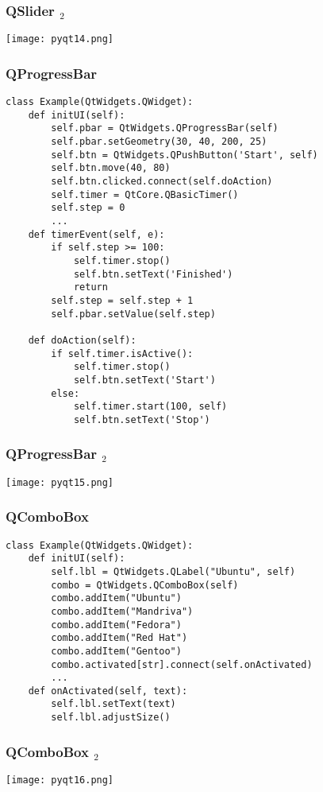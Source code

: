\documentclass[utf8,compress,aspectratio=169]{beamer}
\begin{document}
\begin{frame}[fragile]
  \frametitle{QSlider $_2$}
\begin{center}
\texttt{[image: pyqt14.png]}
\end{center}
\end{frame}

\begin{frame}
  \frametitle{QProgressBar}
\begin{verbatim}
class Example(QtWidgets.QWidget):
    def initUI(self):
        self.pbar = QtWidgets.QProgressBar(self)
        self.pbar.setGeometry(30, 40, 200, 25)
        self.btn = QtWidgets.QPushButton('Start', self)
        self.btn.move(40, 80)
        self.btn.clicked.connect(self.doAction)
        self.timer = QtCore.QBasicTimer()
        self.step = 0
        ...
    def timerEvent(self, e):
        if self.step >= 100:
            self.timer.stop()
            self.btn.setText('Finished')
            return
        self.step = self.step + 1
        self.pbar.setValue(self.step)

    def doAction(self):
        if self.timer.isActive():
            self.timer.stop()
            self.btn.setText('Start')
        else:
            self.timer.start(100, self)
            self.btn.setText('Stop')
\end{verbatim}
\end{frame}

\begin{frame}[fragile]
  \frametitle{QProgressBar $_2$}
\begin{center}
\texttt{[image: pyqt15.png]}
\end{center}
\end{frame}

\begin{frame}
  \frametitle{QComboBox}
\begin{verbatim}
class Example(QtWidgets.QWidget):
    def initUI(self):
        self.lbl = QtWidgets.QLabel("Ubuntu", self)
        combo = QtWidgets.QComboBox(self)
        combo.addItem("Ubuntu")
        combo.addItem("Mandriva")
        combo.addItem("Fedora")
        combo.addItem("Red Hat")
        combo.addItem("Gentoo")
        combo.activated[str].connect(self.onActivated)
        ...
    def onActivated(self, text):
        self.lbl.setText(text)
        self.lbl.adjustSize()
\end{verbatim}
\end{frame}

\begin{frame}[fragile]
  \frametitle{QComboBox $_2$}
\begin{center}
\texttt{[image: pyqt16.png]}
\end{center}
\end{frame}
\end{document}
